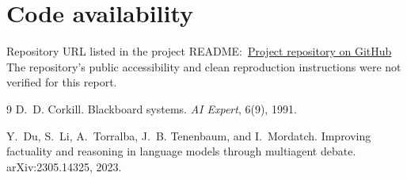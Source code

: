 \documentclass[11pt,a4paper,twocolumn]{article}
\newcommand{\githuburl}{https://github.com/KamathAnjali/Intelligible-Blackboard-Architecture-with-Counterfactual-Agents}
\begin{document}
\section*{Code availability}
\noindent Repository URL listed in the project README:\
\href{\githuburl}{Project repository on GitHub}\\
The repository's public accessibility and clean reproduction instructions were not verified for this report.

\begin{thebibliography}{9}
\small
{}
D.~D. Corkill.
\newblock Blackboard systems.
\newblock \emph{AI Expert}, 6(9), 1991.

Y.~Du, S.~Li, A.~Torralba, J.~B. Tenenbaum, and I.~Mordatch.
\newblock Improving factuality and reasoning in language models through multiagent debate.
\newblock arXiv:2305.14325, 2023.
\end{thebibliography}
\end{document}
